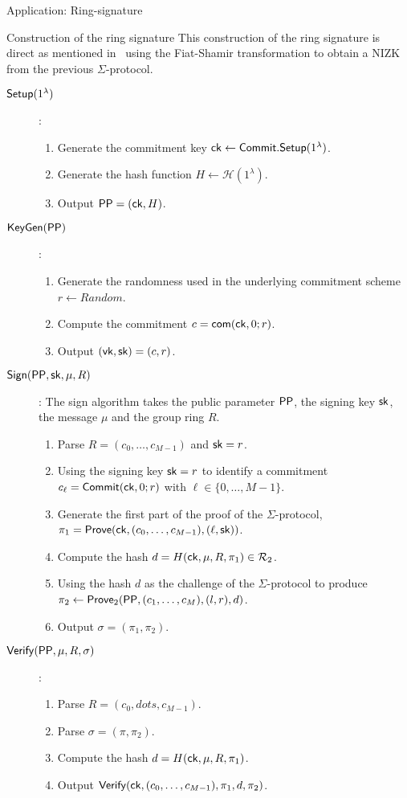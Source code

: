 \begin{section}{Application: Ring-signature}
\begin{subsection}{Construction of the ring signature}
    This construction of the ring signature is direct as mentioned in~\cite{DBLP:conf/eurocrypt/GrothK15} using the Fiat-Shamir transformation to obtain a NIZK from the previous $\Sigma$-protocol.
    \begin{description}
      \item [${\mathsf{Setup}}(1^\lambda)$]:
      \begin{enumerate}
        \item Generate the commitment key $\mathsf{ck} \gets {\mathsf{Commit}}.{\mathsf{Setup}}(1^\lambda)$.
        \item Generate the hash function $H \gets \mathcal{H}(1^\lambda)$.
        \item Output ${\mathsf{PP}} = (\mathsf{ck}, H)$.
      \end{enumerate}
      \item [${\mathsf{KeyGen}}({\mathsf{PP}})$]:
      \begin{enumerate}
        \item Generate the randomness used in the underlying commitment scheme $r \gets Random$.
        \item Compute the commitment $c = \mathsf{com}(\mathsf{ck}, 0; r)$.
        \item Output $(\mathsf{vk}, \mathsf{sk}) = (c, r)$.
      \end{enumerate}
      \item [${\mathsf{Sign}}({\mathsf{PP}}, \mathsf{sk}, \mu, R)$]: The sign algorithm takes the public parameter ${\mathsf{PP}}$, the signing key $\mathsf{sk}$, the message $\mu$ and the group ring $R$.
      \begin{enumerate}
        \item Parse $R = (c_0, \dots, c_{M-1})$ and $\mathsf{sk} = r$.
        \item Using the signing key $\mathsf{sk} = r$ to identify a commitment $c_{\ell} = {\mathsf{Commit}}(\mathsf{ck}, 0; r)$ with $\ell \in \{0, \dots, M-1\}$.
        \item Generate the first part of the proof of the $\Sigma$-protocol, $\pi_1 = {\mathsf{Prove}}(\mathsf{ck}, (c_0, \dots, c_{M-1}), (\ell, \mathsf{sk}))$.
        \item Compute the hash $d = H(\mathsf{ck}, \mu, R, \pi_1) \in {\mathcal{R}}_2$.
        \item Using the hash $d$ as the challenge of the $\Sigma$-protocol to produce $\pi_2 \gets {\mathsf{Prove}}_2({\mathsf{PP}}, (c_1, \dots, c_M), (l, r), d)$.
        \item Output $\sigma = (\pi_1, \pi_2)$.
      \end{enumerate}
      \item [${\mathsf{Verify}}({\mathsf{PP}}, \mu, R, \sigma)$]:
      \begin{enumerate}
        \item Parse $R = (c_0, dots, c_{M-1})$.
        \item Parse $\sigma = (\pi, \pi_2)$.
        \item Compute the hash $d = H(\mathsf{ck}, \mu, R, \pi_1)$.
        \item Output ${\mathsf{Verify}} (\mathsf{ck}, (c_0, \dots, c_{M-1}), \pi_1, d, \pi_2)$.
      \end{enumerate}
    \end{description}


\end{subsection}
\end{section}
